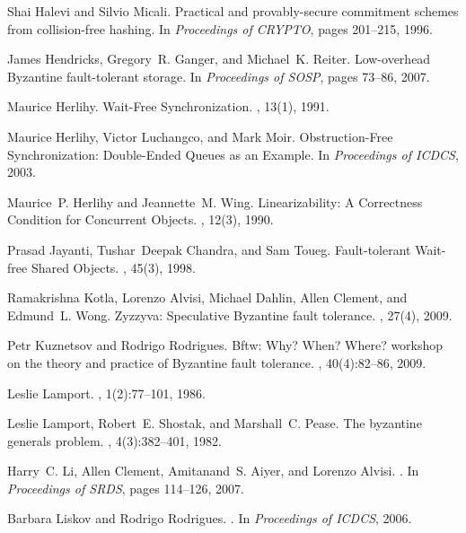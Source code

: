 \documentclass[10pt,conference,compsocconf]{IEEEtran}
\begin{document}
\begin{thebibliography}{10}
Shai Halevi and Silvio Micali.
\newblock Practical and provably-secure commitment schemes from collision-free
  hashing.
\newblock In {\em Proceedings of CRYPTO}, pages 201--215, 1996.

James Hendricks, Gregory~R. Ganger, and Michael~K. Reiter.
\newblock Low-overhead {B}yzantine fault-tolerant storage.
\newblock In {\em Proceedings of SOSP}, pages 73--86, 2007.

Maurice Herlihy.
\newblock Wait-{F}ree {S}ynchronization.
, 13(1), 1991.

Maurice Herlihy, Victor Luchangco, and Mark Moir.
\newblock Obstruction-{F}ree {S}ynchronization: {D}ouble-{E}nded {Q}ueues as an
  {E}xample.
\newblock In {\em Proceedings of ICDCS}, 2003.

Maurice~P. Herlihy and Jeannette~M. Wing.
\newblock Linearizability: {A} {C}orrectness {C}ondition for {C}oncurrent
  {O}bjects.
, 12(3), 1990.

Prasad Jayanti, Tushar~Deepak Chandra, and Sam Toueg.
\newblock Fault-tolerant {W}ait-free {S}hared {O}bjects.
, 45(3), 1998.

Ramakrishna Kotla, Lorenzo Alvisi, Michael Dahlin, Allen Clement, and Edmund~L.
  Wong.
\newblock Zyzzyva: Speculative {B}yzantine fault tolerance.
, 27(4), 2009.

Petr Kuznetsov and Rodrigo Rodrigues.
\newblock Bftw: {W}hy? {W}hen? {W}here? workshop on the theory and
  practice of {B}yzantine fault tolerance.
, 40(4):82--86, 2009.

Leslie Lamport.
, 1(2):77--101, 1986.

Leslie Lamport, Robert~E. Shostak, and Marshall~C. Pease.
\newblock The byzantine generals problem.
, 4(3):382--401, 1982.

Harry~C. Li, Allen Clement, Amitanand~S. Aiyer, and Lorenzo Alvisi.
.
\newblock In {\em Proceedings of SRDS}, pages 114--126, 2007.

Barbara Liskov and Rodrigo Rodrigues.
.
\newblock In {\em Proceedings of ICDCS}, 2006.


\end{thebibliography}
\end{document}
